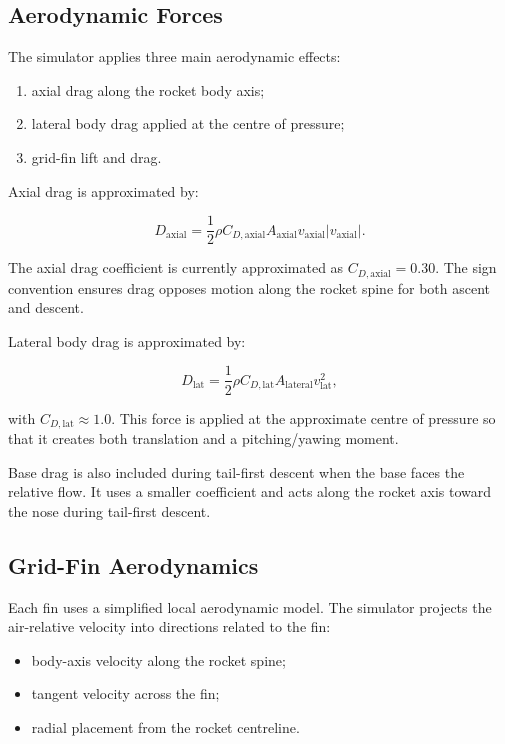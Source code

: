 \documentclass[12pt,a4paper]{article}
\begin{document}
\subsection{Aerodynamic Forces}

The simulator applies three main aerodynamic effects:

\begin{enumerate}
    \item axial drag along the rocket body axis;
    \item lateral body drag applied at the centre of pressure;
    \item grid-fin lift and drag.
\end{enumerate}

Axial drag is approximated by:

\begin{equation}
D_{\mathrm{axial}} =
\frac{1}{2} \rho C_{D,\mathrm{axial}} A_{\mathrm{axial}}
v_{\mathrm{axial}} |v_{\mathrm{axial}}|.
\end{equation}

The axial drag coefficient is currently approximated as \(C_{D,\mathrm{axial}} = 0.30\). The sign convention ensures drag opposes motion along the rocket spine for both ascent and descent.

Lateral body drag is approximated by:

\begin{equation}
D_{\mathrm{lat}} =
\frac{1}{2} \rho C_{D,\mathrm{lat}} A_{\mathrm{lateral}}
v_{\mathrm{lat}}^2,
\end{equation}

with \(C_{D,\mathrm{lat}} \approx 1.0\). This force is applied at the approximate centre of pressure so that it creates both translation and a pitching/yawing moment.

Base drag is also included during tail-first descent when the base faces the relative flow. It uses a smaller coefficient and acts along the rocket axis toward the nose during tail-first descent.

\subsection{Grid-Fin Aerodynamics}

Each fin uses a simplified local aerodynamic model. The simulator projects the air-relative velocity into directions related to the fin:

\begin{itemize}
    \item body-axis velocity along the rocket spine;
    \item tangent velocity across the fin;
    \item radial placement from the rocket centreline.
\end{itemize}
\end{document}
